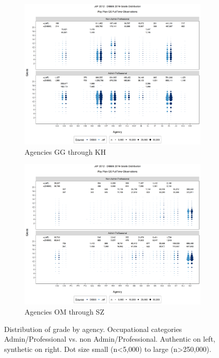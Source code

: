 \documentclass[10pt, letterpaper]{article}
\begin{document}
\begin{spacing}{1.0}
\begin{figure}[]
    \centering
    \begin{subfigure}{1\textwidth}
        \centering
        \includegraphics[width=6in, trim={0 0.55in 0 0.75in}, clip]{JdFDIBBSGSFullTimeGradeAdminProfessionalAgency61.png}
        \caption{Agencies GG through KH}
        \vspace{10pt}
    \end{subfigure}
    \begin{subfigure}{1\textwidth}
        \centering
        \includegraphics[width=6in, trim={0 0.55in 0 0.75in}, clip]{JdFDIBBSGSFullTimeGradeAdminProfessionalAgency101.png}
        \caption{Agencies OM through SZ}
    \end{subfigure}
    \caption{Distribution of grade by agency.  Occupational categories Admin/Professional vs. non Admin/Professional.  Authentic on left, synthetic on right.  Dot size small (n<5,000) to large (n>250,000).}
    \label{figure:JdFDIBBSGSFullTimeGradeAdminProfessionalAgency}
\end{figure}


\end{spacing}
\end{document}
